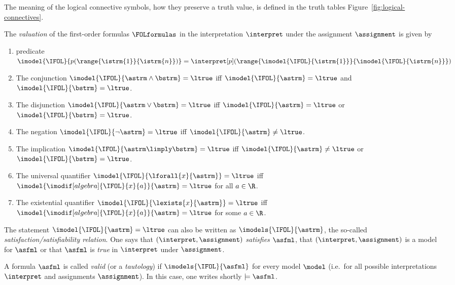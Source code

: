             The meaning of the logical connective symbols, how they preserve a truth value, is defined in the truth tables Figure~\ref{fig:logical-connectives}.
            \begin{definition}
                The \emph{valuation} of the first-order formulas $\FOLformulas$ in the interpretation $\interpret$ under the assignment $\assignment$ is given by
                \begin{enumerate}
                    \item predicate $\imodel{\IFOL}{p(\range{\istrm{1}}{\istrm{n}})} = \interpret[p](\range{\imodel{\IFOL}{\istrm{1}}}{\imodel{\IFOL}{\istrm{n}}})$
                    \item The conjunction $\imodel{\IFOL}{\astrm\land\bstrm} = \ltrue$ iff $\imodel{\IFOL}{\astrm}=\ltrue$ and $\imodel{\IFOL}{\bstrm}=\ltrue$.
                    \item The disjunction $\imodel{\IFOL}{\astrm\lor\bstrm} = \ltrue$ iff $\imodel{\IFOL}{\astrm}=\ltrue$ or $\imodel{\IFOL}{\bstrm}=\ltrue$.
                    \item The negation $\imodel{\IFOL}{\lnot\astrm} = \ltrue$ iff $\imodel{\IFOL}{\astrm} \neq \ltrue$.
                    \item The implication $\imodel{\IFOL}{\astrm\limply\bstrm} = \ltrue$ iff $\imodel{\IFOL}{\astrm} \neq \ltrue$ or $\imodel{\IFOL}{\bstrm}=\ltrue$.
                    \item The universal quantifier $\imodel{\IFOL}{\lforall{x}{\astrm}} = \ltrue$ iff $\imodel{\imodif[algebra]{\IFOL}{x}{a}}{\astrm} = \ltrue$ for all $a\in\R$.
                    \item The existential quantifier $\imodel{\IFOL}{\lexists{x}{\astrm}} = \ltrue$ iff $\imodel{\imodif[algebra]{\IFOL}{x}{a}}{\astrm} = \ltrue$ for some $a\in\R$.
                \end{enumerate}
                The statement $\imodel{\IFOL}{\astrm}=\ltrue$ can also be written as $\imodels{\IFOL}{\astrm}$, the so-called \emph{satisfaction/satisfiability relation}.
                One says that $(\interpret,\assignment)$ \emph{satisfies} $\asfml$, that $(\interpret,\assignment)$ is a model for $\asfml$ or that $\asfml$ is \emph{true} in $\interpret$ under $\assignment$.

                A formula $\asfml$ is called \emph{valid} (or a \emph{tautology}) if $\imodels{\IFOL}{\asfml}$ for every model $\model$ (i.e.\ for all possible interpretations $\interpret$ and assignments $\assignment$). In this case, one writes shortly $\models\asfml$.
            \end{definition}

